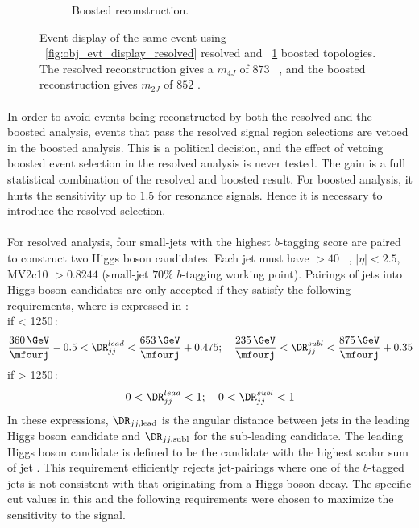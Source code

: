 \begin{figure}[h!]
\begin{subfigure}[b]{0.45\textwidth}
        \caption{Boosted reconstruction.}
        \label{fig:obj_evt_display_boosted}
    \end{subfigure}
\caption{Event display of the same event using ~\ref{fig:obj_evt_display_resolved} resolved and ~\ref{fig:obj_evt_display_boosted} boosted topologies. The resolved reconstruction gives a $m_{4J}$ of $873$ \GeV~, and the boosted reconstruction gives $m_{2J}$ of $852$ \GeV. }
\label{fig:obj_evt_display}
\end{figure}

\paragraph{}
In order to avoid events being reconstructed by both the resolved and the boosted analysis, events that pass the resolved signal region selections are vetoed in the boosted analysis.
This is a political decision, and the effect of vetoing boosted event selection in the resolved analysis is never tested.
The gain is a full statistical combination of the resolved and boosted result.
For boosted analysis,  it hurts the sensitivity up to $1.5$ \TeV for resonance signals.
Hence it is necessary to introduce the resolved selection.

\paragraph{}
For resolved analysis, four small-\R jets with the highest $b$-tagging score are paired to construct two Higgs boson candidates.  
Each jet must have \pt $> 40$ \GeV~, $|\eta| < 2.5$, MV2c10 $> 0.8244$ (small-\R jet $70\%$ $b$-tagging working point). 
Pairings of jets into Higgs boson candidates are only accepted if they satisfy the following requirements, where \mfourj is expressed in \GeV:\\
if \mfourj  < 1250\,\GeV:
\begin{equation}
\frac{360\,\GeV}{\mfourj} - 0.5 < \DR_{jj}^{lead} < \frac{653\,\GeV}{\mfourj} + 0.475;\quad
\frac{235\,\GeV}{\mfourj} < \DR_{jj}^{subl}  < \frac{875\,\GeV}{\mfourj} + 0.35
\end{equation}
\quad if \mfourj  > 1250\,\GeV:
\begin{equation}
0< \DR_{jj}^{lead} < 1;\quad 0 < \DR_{jj}^{subl} < 1
\end{equation}
In these expressions, $\DR_{jj, \mathrm{lead}}$ is the angular distance between jets in the leading Higgs boson candidate and $\DR_{jj, \mathrm{subl}}$ for the sub-leading candidate. 
The leading Higgs boson candidate is defined to be the candidate with the highest scalar sum of jet \pt. 
This requirement efficiently rejects jet-pairings where one of the $b$-tagged jets is not consistent with that originating from a Higgs boson decay. 
The specific cut values in this and the following requirements were chosen to maximize the sensitivity to the signal.

